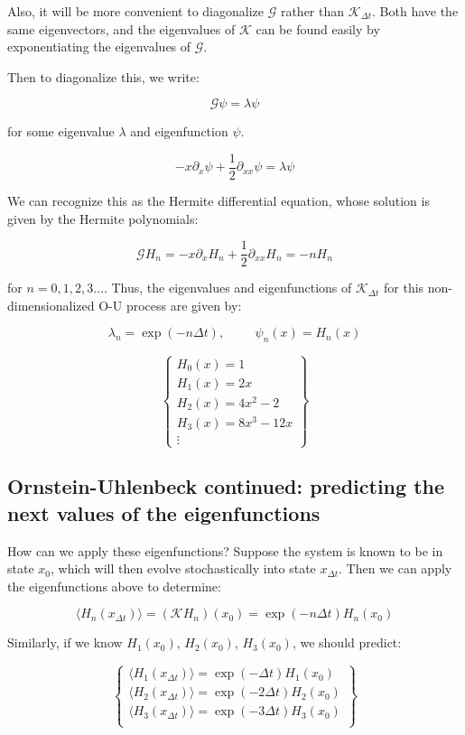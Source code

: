 \documentclass[]{article}
\newcommand{\p}[1]{\left( #1 \right)}
\newcommand{\Kp}{\mathcal{K}}
\begin{document}
Also, it will be more convenient to diagonalize $\mathcal{G}$ rather than $\Kp_{\Delta t}$. Both have the same eigenvectors, and the eigenvalues of $\Kp$ can be found easily by exponentiating the eigenvalues of $\mathcal{G}$.

Then to diagonalize this, we write:

$$
\mathcal{G} \psi = \lambda \psi
$$

for some eigenvalue $\lambda$ and eigenfunction $\psi$.

$$
- x\partial_x \psi + \frac{1}{2}\partial_{xx}\psi = \lambda \psi
$$

We can recognize this as the Hermite differential equation, whose solution is given by the Hermite polynomials:

$$
\mathcal{G} H_n = - x\partial_x H_n + \frac{1}{2}\partial_{xx} H_n = -nH_n
$$

for $n=0,1,2,3\dots$. Thus, the eigenvalues and eigenfunctions of $\Kp_{\Delta t}$ for this non-dimensionalized O-U process are given by:

$$
\lambda_n = \exp(-n\Delta t),\hspace{1cm} \psi_n(x) = H_n(x)
$$

$$
\begin{Bmatrix}
	H_0(x) = 1 \\
	H_1(x) = 2x \\
	H_2(x) = 4x^2 - 2\\
	H_3(x) = 8x^3 - 12x \\
	\vdots
\end{Bmatrix}
$$

\subsection{Ornstein-Uhlenbeck continued: predicting the next values of the eigenfunctions}

How can we apply these eigenfunctions? Suppose the system is known to be in state $x_0$, which will then evolve stochastically into state $x_{\Delta t}$. Then we can apply the eigenfunctions above to determine:

$$
\langle H_n(x_{\Delta t}) \rangle = \p{\Kp H_n}(x_0) = \exp(-n\Delta t) H_n(x_0)
$$

Similarly, if we know $H_1(x_0)$, $H_2(x_0)$, $H_3(x_0)$, we should predict:

$$
\begin{Bmatrix}
	\langle H_1(x_{\Delta t}) \rangle = \exp(-\Delta t) H_1(x_0) \\
	\langle H_2(x_{\Delta t}) \rangle = \exp(-2\Delta t) H_2(x_0) \\
	\langle H_3(x_{\Delta t}) \rangle = \exp(-3\Delta t) H_3(x_0) \\
\end{Bmatrix}
$$
\end{document}

